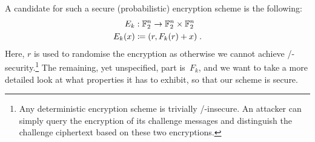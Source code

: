 A candidate for such a secure (probabilistic) encryption scheme is the following:
\begin{equation}\label{eqn:enc-prp}
    \begin{aligned}
        E_k &: \mathbb{F}_2^n \to \mathbb{F}_2^n \times \mathbb{F}_2^n \\
        E_k(x) &\coloneqq (r, F_k(r) + x)\;.
    \end{aligned}
\end{equation}
Here, $r$ is used to randomise the encryption as otherwise we cannot achieve \CPA/-security.\footnote{%
    Any deterministic encryption scheme is trivially \CPA/-insecure.
    An attacker can simply query the encryption of its challenge messages and distinguish the challenge ciphertext based on these two encryptions.
}
The remaining, yet unspecified, part is~$F_k$, and we want to take a more detailed look at what properties it has to exhibit, so that our scheme is secure.

